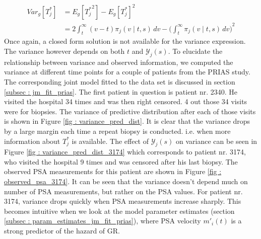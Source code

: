 \begin{equation}
\begin{split}
Var_g[T^*_j] &= E_g[{T^*_j}^2] - {E_g[T^*_j]}^2\\
&= 2 \int_t^\infty {(v-t) \pi_j(v \mid t, s) \,dv} - {\bigg(\int_t^\infty \pi_j(v \mid t, s) \,dv\bigg)}^2
\end{split}
\end{equation}
Once again, a closed form solution is not available for the variance expression. The variance however depends on both $t$ and $\mathcal{Y}_j(s)$. To elucidate the relationship between variance and observed information, we computed the variance at different time points for a couple of patients from the PRIAS study. The corresponding joint model fitted to the data set is discussed in section \ref{subsec : jm_fit_prias}. The first patient in question is patient nr. 2340. He visited the hospital 34 times and was then right censored. 4 out those 34 visits were for biopsies. The variance of predictive distribution after each of those visits is shown in Figure \ref{fig : variance_pred_dist}. It is clear that the variance drops by a large margin each time a repeat biopsy is conducted. i.e. when more information about $T^*_j$ is available. The effect of $\mathcal{Y}_j(s)$ on variance can be seen in Figure \ref{fig : variance_pred_dist_3174} which corresponds to patient nr. 3174, who visited the hospital 9 times and was censored after his last biopsy. The observed PSA measurements for this patient are shown in Figure \ref{fig : observed_psa_3174}. It can be seen that the variance doesn't depend much on number of PSA measurements, but rather on the PSA values. For patient nr. 3174, variance drops quickly when PSA measurements increase sharply.  This becomes intuitive when we look at the model parameter estimates (section \ref{subsec : param_estimates_jm_fit_prias}), where PSA velocity $m'_i(t)$ is a strong predictor of the hazard of GR.

